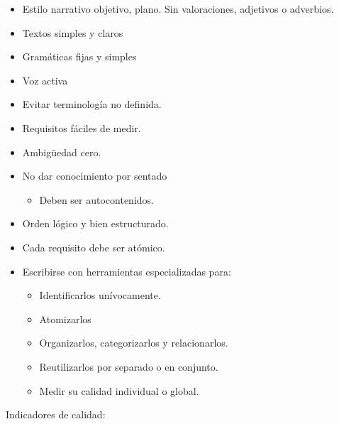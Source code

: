 \documentclass[12pt, twoside, openright]{report} %
\begin{document}
\begin{itemize}
	\item Estilo narrativo objetivo, plano. Sin valoraciones, adjetivos o
	      adverbios.
	\item Textos simples y claros
	\item Gramáticas fijas y simples
	\item Voz activa
	\item Evitar terminología no definida.
	\item Requisitos fáciles de medir.
	\item Ambigüedad cero.
	\item No dar conocimiento por sentado

	      \begin{itemize}
		      \item Deben ser autocontenidos.
	      \end{itemize}
	\item Orden lógico y bien estructurado.
	\item Cada requisito debe ser atómico.
	\item Escribirse con herramientas especializadas para:

	      \begin{itemize}
		      \item Identificarlos unívocamente.
		      \item Atomizarlos
		      \item Organizarlos, categorizarlos y relacionarlos.
		      \item Reutilizarlos por separado o en conjunto.
		      \item Medir su calidad individual o global.
	      \end{itemize}
\end{itemize}
\pagebreak
Indicadores de calidad:
\end{document}
